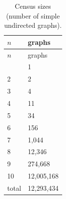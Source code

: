 \documentclass[
]{article}
\begin{document}
\begin{longtable}[]{@{}ll@{}}
\caption{Census sizes (number of simple undirected
graphs).}\label{tbl-census}\tabularnewline
\toprule\noalign{}
\(n\) & graphs \\
\midrule\noalign{}
\endfirsthead
\toprule\noalign{}
\(n\) & graphs \\
\midrule\noalign{}
\endhead
\bottomrule\noalign{}
\endlastfoot
1 & 1 \\
2 & 2 \\
3 & 4 \\
4 & 11 \\
5 & 34 \\
6 & 156 \\
7 & 1,044 \\
8 & 12,346 \\
9 & 274,668 \\
10 & 12,005,168 \\
total & 12,293,434 \\
\end{longtable}
\end{document}
